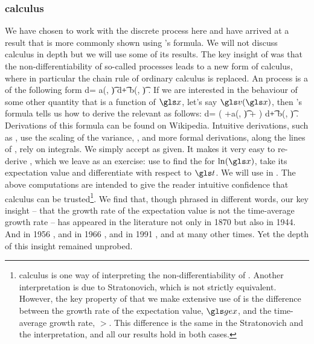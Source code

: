\subsubsection{\Ito calculus}
We have chosen to work with the discrete process here and have arrived at a result that is more
commonly shown using \Ito's formula. We will not discuss \Ito calculus in depth 
but we will use some of its results. The key insight of \Ito was that the non-differentiability
of so-called \Ito processes leads to a new form of calculus, where in particular the chain rule of
ordinary calculus is replaced.
An \Ito process is a \SDE of the following form
\be
d\x = a(\x, \t) d\t + b(\x, \t) \gd\gW.
\ee
If we are interested in the behaviour of some other quantity that is a 
function of $\x$, let's say $\gv(\x)$, then \Ito's formula tells us how to derive
the relevant \SDE as follows:
\be
d\gv =  \left(\frac{\partial \gv}{\partial\t} +a(\x, \t)\frac{\partial \gv}{\partial\x} +  \right) d\t + b(\x, \t) \frac{\partial \gv}{\partial\x} \gd\gW.
\ee
Derivations of this formula can be found on Wikipedia. Intuitive derivations, such as \cite{Hull2006}, use the 
scaling of the variance, , and more formal 
derivations, along the lines of \cite{Harrison2013}, rely on integrals.
We simply accept  as given. It makes it very easy to re-derive , which we leave as an exercise:
use  to find the \SDE for $\ln(\x)$, take its expectation value and differentiate with respect to $\t$. 
We will use  in . The above computations are intended to 
give the reader intuitive confidence that \Ito calculus can be 
trusted\footnote{\Ito calculus is one way of interpreting the non-differentiability of \gd\gW. Another interpretation
is due to Stratonovich, which is not strictly equivalent. However, the key property of \GBM that we make
extensive use of is the difference between the growth rate of the expectation value, $\gex$, and the
time-average growth rate, $\gt$. This difference is the same in the Stratonovich and the \Ito interpretation, and all our results hold in both cases.}. 
We find that, though phrased in different words, our key insight -- that the growth rate of the expectation value is not the time-average
growth rate -- has appeared in the literature not only in 1870 but also in 1944.
And in 1956 \cite{Kelly1956}, and in 1966 \cite{Thorp1966}, and in 1991 \cite{CoverThomas1991}, and at many other times. 
Yet the depth of this insight remained unprobed.

